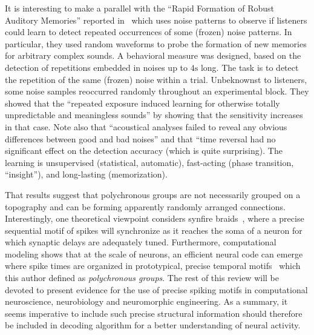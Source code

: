 \documentclass[brainsci, %
               review,submit,pdftex,moreauthors
               ]{Definitions/mdpi}
\begin{document}
It is interesting to make a parallel with the ``Rapid Formation of Robust Auditory Memories'' reported in~\citep{agus_rapid_2010} which uses noise patterns to observe if listeners could learn to detect repeated occurrences of some (frozen) noise patterns. In particular, they used random waveforms to probe the formation of new memories for arbitrary complex sounds. A behavioral measure was designed, based on the detection of repetitions embedded in noises up to $4 \si{\second}$ long. The task is to detect the repetition of the same (frozen) noise within a trial. Unbeknownst to listeners, some noise samples reoccurred randomly throughout an experimental block. They showed that the ``repeated exposure induced learning for otherwise totally unpredictable and meaningless sounds'' by showing that the sensitivity increases in that case. Note also that ``acoustical analyses failed to reveal any obvious differences between good and bad noises'' and that ``time reversal had no significant effect on the detection accuracy (which is quite surprising). The learning is unsupervised (statistical, automatic), fast-acting (phase transition, ``insight''), and long-lasting (memorization). 

That results suggest that polychronous groups are not necessarily grouped on a topography and can be forming apparently randomly arranged connections. Interestingly, one theoretical viewpoint considers synfire braids~\citep{bienenstock_model_1995}, where a precise sequential motif of spikes will synchronize as it reaches the soma of a neuron for which synaptic delays are adequately tuned. Furthermore, computational modeling shows that at the scale of neurons, an efficient neural code can emerge where spike times are organized in prototypical, precise temporal motifs~\citep{izhikevich_polychronization_2006} which this author defined as \emph{polychronous groups}. The rest of this review will be devoted to present evidence for the use of precise spiking motifs in computational neuroscience, neurobiology and neuromorphic engineering.
As a summary, it seems imperative to include such precise structural information should therefore be included in decoding algorithm for a better understanding of neural activity.
\end{document}
